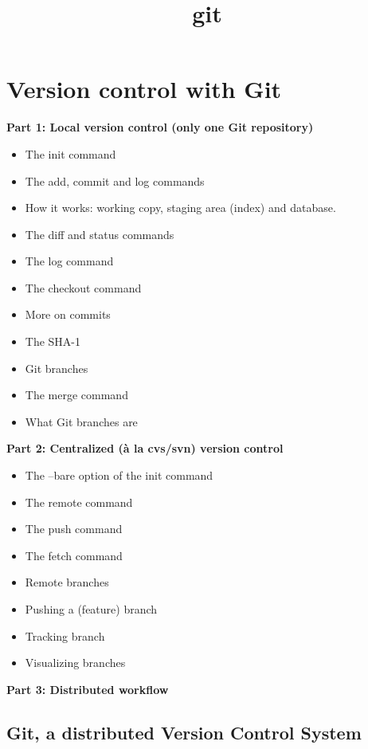 \documentclass{article}
\title{git}
\begin{document}
    
    
    \maketitle
    
    

    

    \section{Version control with Git}


    

    \textbf{Part 1: Local version control (only one Git repository)}

\begin{itemize}
\item
  The init command
\item
  The add, commit and log commands
\item
  How it works: working copy, staging area (index) and database.
\item
  The diff and status commands
\item
  The log command
\item
  The checkout command
\item
  More on commits
\item
  The SHA-1
\item
  Git branches
\item
  The merge command
\item
  What Git branches are
\end{itemize}
\textbf{Part 2: Centralized (à la cvs/svn) version control}

\begin{itemize}
\item
  The --bare option of the init command
\item
  The remote command
\item
  The push command
\item
  The fetch command
\item
  Remote branches
\item
  Pushing a (feature) branch
\item
  Tracking branch
\item
  Visualizing branches
\end{itemize}
\textbf{Part 3: Distributed workflow}


    \subsection{Git, a distributed Version Control System}
\end{document}
